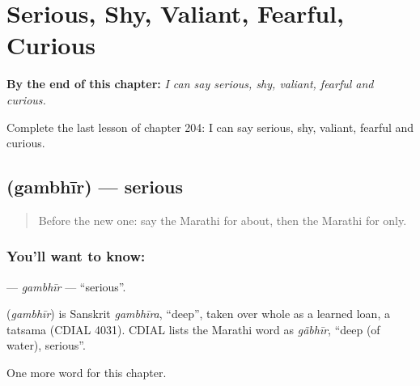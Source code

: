 
\chapter{Serious, Shy, Valiant, Fearful, Curious}
\label{ch:mr-serious-shy-valiant-fearful-curious}

\begin{chapteropening}
\textbf{By the end of this chapter:} \emph{I can say serious, shy, valiant, fearful and curious.}

Complete the last lesson of chapter 204: I can say serious, shy, valiant, fearful and curious.
\end{chapteropening}

\section[\texorpdfstring{\mr{गंभीर} (gambhīr)}{गंभीर (gambhīr)}]{ (gambhīr) — serious}

\label{lesson:MR-C204-gambhir}



\begin{quote}
Before the new one: say the Marathi for about, then the Marathi for only.
\end{quote}

\subsection*{You'll want to know: }
\textbf{} — \emph{gambhīr} — \textquotedblleft{}serious\textquotedblright{}.

\begin{cousinweb}
\textbf{} (\emph{gambhīr}) is Sanskrit \emph{gambhīra}, \textquotedblleft{}deep\textquotedblright{}, taken over whole as a learned loan, a tatsama (CDIAL 4031). CDIAL lists the Marathi word as \emph{gãbhīr}, \textquotedblleft{}deep (of water), serious\textquotedblright{}.
\end{cousinweb}

\begin{grammarlens}[title={What you've built}]
One more word for this chapter.
\end{grammarlens}

